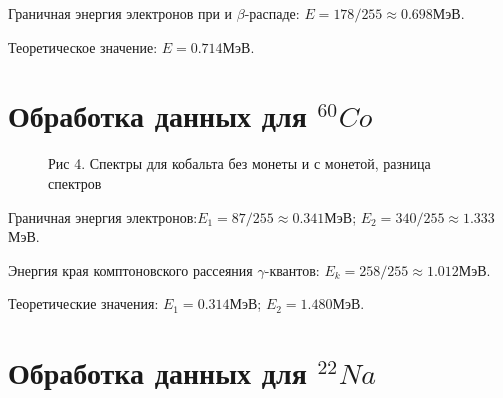 \documentclass[12pt]{article}
\begin{document}
    Граничная энергия электронов при и $\beta$-распаде: $E = 178/255
    \approx 0.698$МэВ.

    Теоретическое значение: $E = 0.714$МэВ.


  \newpage
  \section{Обработка данных для $^{60}Co$}

    \begin{figure}[h!]
      \begin{minipage}[h]{\linewidth}
        Рис 4. Спектры для кобальта без монеты и с монетой, разница спектров
      \end{minipage}
      \label{chart:cobalt}
    \end{figure}

    Граничная энергия электронов:$E_1 = 87/255 \approx 0.341$МэВ;
    $E_2 = 340/255 \approx 1.333$МэВ.

    Энергия края комптоновского рассеяния $\gamma$-квантов:
    $E_k = 258/255 \approx 1.012$МэВ.

    Теоретические значения: $E_1 = 0.314$МэВ; $E_2 = 1.480$МэВ.


  \newpage
  \section{Обработка данных для $^{22}Na$}
\end{document}
